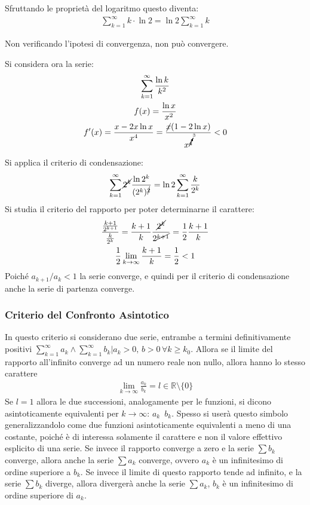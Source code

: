\documentclass{article}
\numberwithin{equation}{subsection}
\begin{document}
Sfruttando le proprietà del logaritmo questo diventa:
\begin{gather*}
    \displaystyle\sum_{k=1}^\infty k\cdot{\ln 2}=\ln 2\displaystyle\sum_{k=1}^\infty k
\end{gather*}

Non verificando l'ipotesi di convergenza, non può convergere. 

Si considera ora la serie:
\begin{gather*}
    \displaystyle\sum_{k=1}^\infty\frac{\ln k}{k^2}\\
    \displaystyle f(x)=\frac{\ln x}{x^2}\\
    f'(x)=\displaystyle\frac{x-2x\ln x}{x^4}=\frac{\cancel{x}(1-2\ln x)}{x^{\cancelto{3}{4}}}<0
\end{gather*}

Si applica il criterio di condensazione:
\begin{gather*}
    \displaystyle\sum_{k=1}^\infty \cancel{2^k}\frac{\ln 2^k}{(2^k)^{\cancel{2}}}=\ln2\sum_{k=1}^\infty\frac{k}{2^k}
\end{gather*}
Si studia il criterio del rapporto per poter determinarne il carattere:
\begin{gather*}
    \displaystyle\frac{\frac{k+1}{2^{k+1}}}{\frac{k}{2^k}}=\frac{k+1}{k}\frac{\cancel{2^k}}{2^{\cancel{k+1}}}=\frac{1}{2}\frac{k+1}{k}\\
    \frac{1}{2}\lim_{k\to\infty}\frac{k+1}{k}=\frac{1}{2}<1
\end{gather*}
Poiché $a_{k+1}/a_{k}<1$ la serie converge, e quindi per il criterio di condensazione anche la serie di partenza converge.  

\subsubsection{Criterio del Confronto Asintotico}

In questo criterio si considerano due serie, entrambe a termini definitivamente positivi $\sum_{k=1}^\infty a_k \land \sum_{k=1}^\infty b_k | a_k>0,\,b>0\,\forall k\geq k_0$. Allora se il limite del rapporto all'infinito converge ad un numero reale non nullo, allora hanno lo stesso carattere
\begin{gather*}
    \lim_{k\to\infty}\frac{a_k}{b_k}=l\in\mathbb{R}\setminus\{0\}
\end{gather*}
Se $l=1$ allora le due successioni, analogamente per le funzioni, si dicono asintoticamente equivalenti per $k\to\infty$: $a_k$~$b_k$. %
Spesso si userà questo simbolo generalizzandolo come due funzioni asintoticamente equivalenti a meno di una costante, poiché è di interessa solamente il carattere e non il valore effettivo esplicito di una serie. 
Se invece il rapporto converge a zero e la serie $\sum b_k$ converge, allora anche la serie $\sum a_k$ converge, ovvero $a_k$ è un infinitesimo di ordine superiore a $b_k$. 
Se invece il limite di questo rapporto tende ad infinito, e la serie $\sum b_k$ diverge, allora divergerà anche la serie $\sum a_k$, $b_k$ è un infinitesimo di ordine superiore di $a_k$. 
\end{document}
